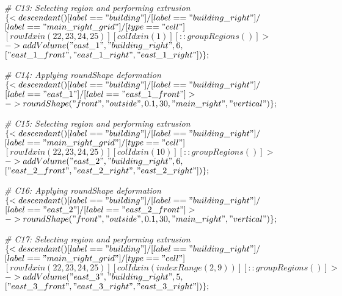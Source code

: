\noindent \textit{\# C13: Selecting region and performing extrusion}\\
$\{< descendant() [label=="building"] / [label=="building\_right"] / $\\
$[label=="main\_right\_grid"] / [type=="cell"] $\\
$[rowIdx in (22, 23, 24, 25)] [colIdx in (1)] [::groupRegions()] > $\\
$-> addVolume("east\_1", "building\_right", 6, $\\
$["east\_1\_front", "east\_1\_right", "east\_1\_right"])\};$

\noindent \textit{\# C14: Applying roundShape deformation}\\
$\{< descendant() [label=="building"] / [label=="building\_right"] / $\\
$[label=="east\_1"] / [label=="east\_1\_front"] > $\\
$-> roundShape("front", "outside", 0.1, 30, "main\_right", "vertical")\};$

\noindent \textit{\# C15: Selecting region and performing extrusion}\\
$\{< descendant() [label=="building"] / [label=="building\_right"] / $\\
$[label=="main\_right\_grid"] / [type=="cell"] $\\
$[rowIdx in (22, 23, 24, 25)] [colIdx in (10)] [::groupRegions()] > $\\
$-> addVolume("east\_2", "building\_right", 6, $\\
$["east\_2\_front", "east\_2\_right", "east\_2\_right"])\};$

\noindent \textit{\# C16: Applying roundShape deformation}\\
$\{< descendant() [label=="building"] / [label=="building\_right"] / $\\
$[label=="east\_2"] / [label=="east\_2\_front"] > $\\
$-> roundShape("front", "outside", 0.1, 30, "main\_right", "vertical")\};$

\noindent \textit{\# C17: Selecting region and performing extrusion}\\
$\{< descendant() [label=="building"] / [label=="building\_right"] / $\\
$[label=="main\_right\_grid"] / [type=="cell"] $\\
$[rowIdx in (22, 23, 24, 25)] [colIdx in (indexRange(2, 9))] [::groupRegions()] > $\\
$-> addVolume("east\_3", "building\_right", 5, $\\
$["east\_3\_front", "east\_3\_right", "east\_3\_right"])\};$

